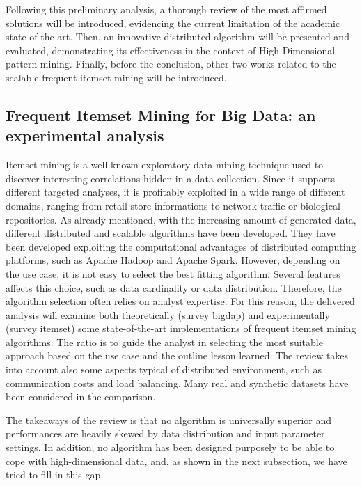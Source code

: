 Following this preliminary analysis, a thorough review of the most affirmed solutions will be introduced, evidencing the current limitation of the academic state of the art.
Then, an innovative distributed algorithm will be presented and evaluated, demonstrating its effectiveness in the context of High-Dimensional pattern mining.
Finally, before the conclusion, other two works related to the scalable frequent itemset mining will be introduced. 




\subsection{Frequent Itemset Mining for Big Data: an experimental analysis}
Itemset mining is a well-known exploratory data mining technique used to
discover interesting correlations hidden in a data collection. Since it supports
different targeted analyses, it is profitably exploited in a wide range
of different domains, ranging from retail store informations to network traffic or biological repositories. As already mentioned, with the increasing amount of generated data, different distributed and scalable algorithms
have been developed. They have been developed exploiting the computational advantages of distributed
computing platforms, such as Apache Hadoop and Apache Spark. However, depending on the use case, it is not easy to select the best fitting algorithm. Several features affects this choice, such as data cardinality or data distribution. Therefore, the algorithm selection often relies on analyst expertise. 
For this reason, the delivered analysis will examine both theoretically (survey bigdap) and experimentally (survey itemset) some state-of-the-art implementations of frequent itemset mining algorithms. The ratio is to guide the analyst in selecting the most suitable approach based on the use case and the outline lesson learned. 
The review takes into account also some aspects typical of distributed environment, such as communication costs and load balancing. Many real and synthetic datasets have been considered in the comparison.

The takeaways of the review is that no algorithm is universally superior and performances are heavily skewed by data distribution and input parameter settings. In addition, no algorithm has been designed purposely to be able to cope with high-dimensional data, and, as shown in the next subsection, we have tried to fill in this gap.


